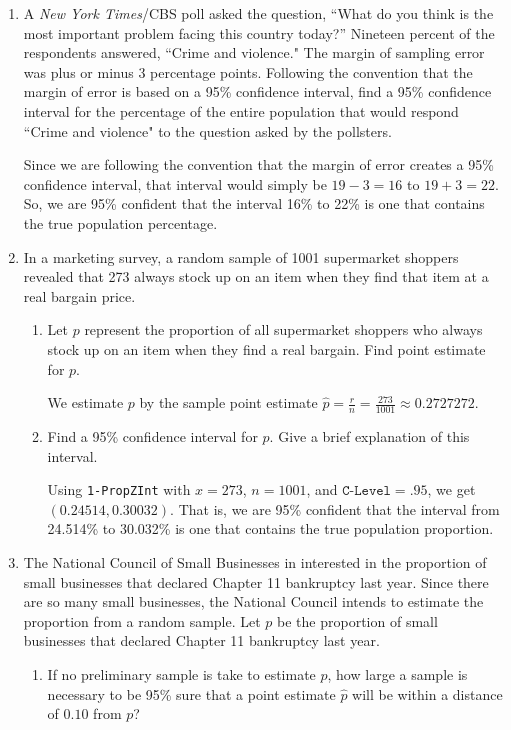 \begin{enumerate}
\item A {\em New York Times}/CBS poll asked the question, ``What do you think is the most important problem facing this country today?'' Nineteen percent of the respondents answered, ``Crime and violence." The margin of sampling error was plus or minus 3 percentage points. Following the convention that the margin of error is based on a 95\% confidence interval, find a 95\% confidence interval for the percentage of the entire population that would respond ``Crime and violence" to the question asked by the pollsters. 

{\answer Since we are following the convention that the margin of error creates a 95\% confidence interval, that interval would simply be $19-3= 16$ to $19+3=22$. So, we are 95\% confident that the interval 16\% to 22\% is one that contains the true population percentage.
} 

\vfill
\pagebreak

\item In a marketing survey, a random sample of 1001 supermarket shoppers revealed that 273 always stock up on an item when they find that item at a real bargain price. 
	\begin{enumerate}
	\item Let $p$ represent the proportion of all supermarket shoppers who always stock up on an item when they find a real bargain. Find point estimate for $p$. 
	
	{\answer We estimate $p$ by the sample point estimate $\hat{p} = \frac{r}{n} = \frac{273}{1001} \approx 0.2727272$.
	} 
	
	\item Find a 95\% confidence interval for $p$. Give a brief explanation of this interval. 
	
	{\answer Using \texttt{1-PropZInt} with $x=273$, $n=1001$, and $\texttt{C-Level} = .95$, we get $(0.24514, 0.30032)$.  
	That is, we are 95\% confident that the interval from 24.514\% to 30.032\% is one that contains the true population proportion.
	} 
	\end{enumerate}

\item The National Council of Small Businesses in interested in the proportion of small businesses that declared Chapter 11 bankruptcy last year. Since there are so many small businesses, the National Council intends to estimate the proportion from a random sample. Let $p$ be the proportion of small businesses that declared Chapter 11 bankruptcy last year.
	\begin{enumerate}
	\item If no preliminary sample is take to estimate $p$, how large a sample is necessary to be 95\% sure that a point estimate $\hat{p}$ will be within a distance of $0.10$ from $p$? 
	

\end{enumerate}
\end{enumerate}
